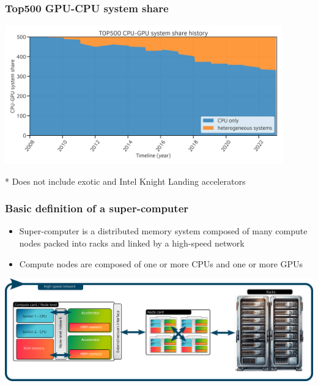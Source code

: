 \documentclass[aspectratio=169]{beamer}
\begin{document}
\begin{frame}
    \frametitle{Top500 GPU-CPU system share}

\begin{center}
    \includegraphics[width=0.9\textwidth]{../../images/top500_cpu_gpu_share_history.png}
\end{center}

\footnotesize
* Does not include exotic and Intel Knight Landing accelerators

\end{frame}


\begin{frame}
    \frametitle{Basic definition of a super-computer}

    \begin{itemize}
        \item Super-computer is a distributed memory system composed of many compute nodes packed into racks and linked by a high-speed network
        \item Compute nodes are composed of one or more CPUs and one or more GPUs
    \end{itemize}

    \begin{center}
        \includegraphics[width=\textwidth]{../../images/super-computer_architecture.png}
    \end{center}

\end{frame}
\end{document}

